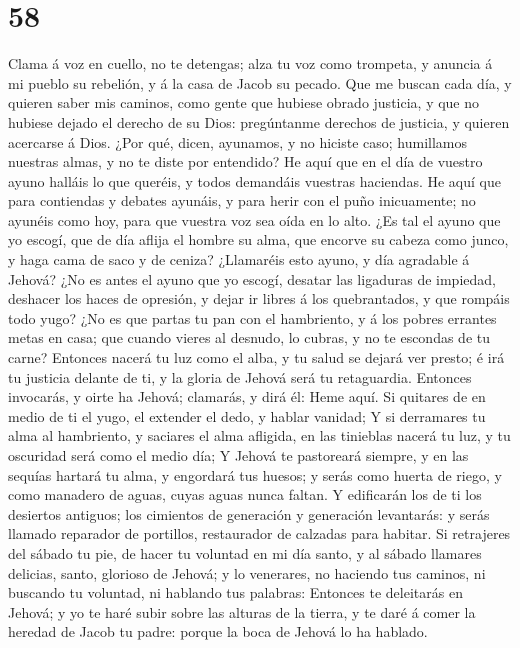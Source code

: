 \hypertarget{section-57}{%
\section{58}\label{section-57}}

 Clama á voz en cuello, no te detengas; alza tu voz como
trompeta, y anuncia á mi pueblo su rebelión, y á la casa de Jacob su
pecado.  Que me buscan cada día, y quieren saber mis
caminos, como gente que hubiese obrado justicia, y que no hubiese dejado
el derecho de su Dios: pregúntanme derechos de justicia, y quieren
acercarse á Dios.  ¿Por qué, dicen, ayunamos, y no hiciste
caso; humillamos nuestras almas, y no te diste por entendido? He aquí
que en el día de vuestro ayuno halláis lo que queréis, y todos demandáis
vuestras haciendas.  He aquí que para contiendas y debates
ayunáis, y para herir con el puño inicuamente; no ayunéis como hoy, para
que vuestra voz sea oída en lo alto.  ¿Es tal el ayuno que
yo escogí, que de día aflija el hombre su alma, que encorve su cabeza
como junco, y haga cama de saco y de ceniza? ¿Llamaréis esto ayuno, y
día agradable á Jehová?  ¿No es antes el ayuno que yo
escogí, desatar las ligaduras de impiedad, deshacer los haces de
opresión, y dejar ir libres á los quebrantados, y que rompáis todo yugo?
 ¿No es que partas tu pan con el hambriento, y á los pobres
errantes metas en casa; que cuando vieres al desnudo, lo cubras, y no te
escondas de tu carne?  Entonces nacerá tu luz como el alba,
y tu salud se dejará ver presto; é irá tu justicia delante de ti, y la
gloria de Jehová será tu retaguardia.  Entonces invocarás, y
oirte ha Jehová; clamarás, y dirá él: Heme aquí. Si quitares de en medio
de ti el yugo, el extender el dedo, y hablar vanidad;  Y si
derramares tu alma al hambriento, y saciares el alma afligida, en las
tinieblas nacerá tu luz, y tu oscuridad será como el medio día;
 Y Jehová te pastoreará siempre, y en las sequías hartará
tu alma, y engordará tus huesos; y serás como huerta de riego, y como
manadero de aguas, cuyas aguas nunca faltan.  Y edificarán
los de ti los desiertos antiguos; los cimientos de generación y
generación levantarás: y serás llamado reparador de portillos,
restaurador de calzadas para habitar.  Si retrajeres del
sábado tu pie, de hacer tu voluntad en mi día santo, y al sábado
llamares delicias, santo, glorioso de Jehová; y lo venerares, no
haciendo tus caminos, ni buscando tu voluntad, ni hablando tus palabras:
 Entonces te deleitarás en Jehová; y yo te haré subir sobre
las alturas de la tierra, y te daré á comer la heredad de Jacob tu
padre: porque la boca de Jehová lo ha hablado.

